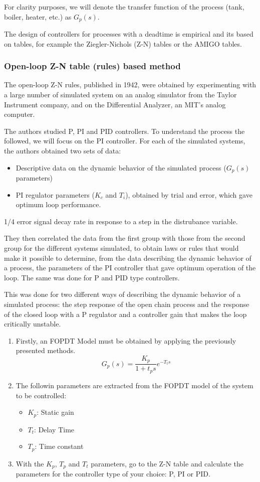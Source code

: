 For clarity purposes, we will denote the transfer function of the process (tank, boiler, heater, etc.) as $G_p(s)$.

The design of controllers for processes with a deadtime is empirical and its based on tables, for example the Ziegler-Nichols (Z-N) tables or the AMIGO tables.

\subsubsection{Open-loop Z-N table (rules) based method}

The open-loop Z-N rules, published in 1942, were obtained by experimenting with a large number of simulated system on an analog simulator from the Taylor Instrument company, and on the Differential Analyzer, an MIT's analog computer.

The authors studied P, PI and PID controllers. To understand the process the followed, we will focus on the PI controller. For each of the simulated systems, the authors obtained two sets of data:
\begin{itemize}
    \item Descriptive data on the dynamic behavior of the simulated process ($G_p(s)$ parameters)
    \item PI regulator parameters ($K_c$ and $T_i$), obtained by trial and error, which gave optimum loop performance.
\end{itemize}

1/4 error signal decay rate in response to a step in the distrubance variable.

They then correlated the data from the first group with those from the second group for the different systems simulated, to obtain laws or rules that would make it possible to determine, from the data describing the dynamic behavior of a process, the parameters of the PI controller that gave optimum operation of the loop. The same was done for P and PID type controllers.

This was done for two different ways of describing the dynamic behavior of a simulated process: the step response of the open chain process and the response of the closed loop with a P regulator and a controller gain that makes the loop critically unstable.

\begin{enumerate}
    \item Firstly, an FOPDT Model must be obtained by applying the previously presented methods.
    \[G_p (s) = \frac{K_p}{1 + t_p s} e^{-T_t s}\]
    \item The followin parameters are extracted from the FOPDT model of the system to be controlled:
    \begin{itemize}
        \item $K_p$: Static gain
        \item $T_t$: Delay Time
        \item $T_p$: Time constant
    \end{itemize}
    \item With the $K_p$, $T_p$ and $T_t$ parameters, go to the Z-N table and calculate the parameters for the controller type of your choice: P, PI or PID.
\end{enumerate}

